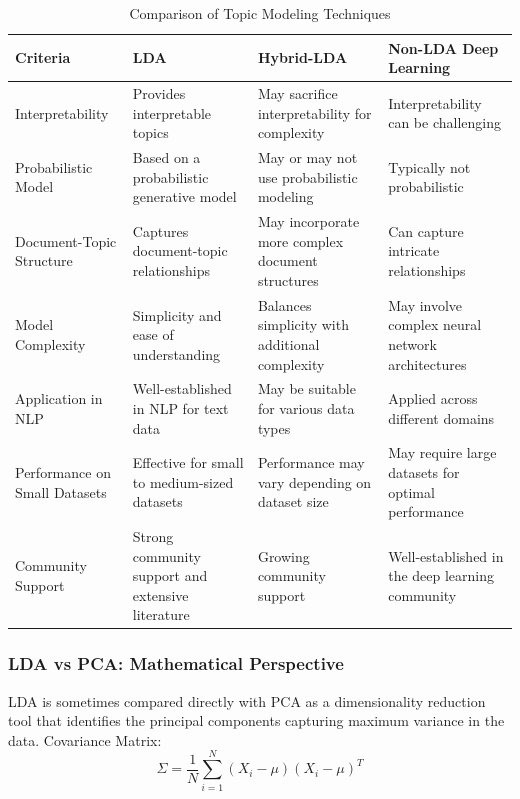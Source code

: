 \documentclass[sn-mathphys,Numbered]{sn-jnl}%
\theoremstyle{thmstyleone}%
\theoremstyle{thmstyletwo}%
\theoremstyle{thmstylethree}%
\begin{document}
\begin{table}[h]
    \centering
    \begin{tabularx}{\textwidth}{X X X X}
        \toprule
        \textbf{Criteria} & \textbf{LDA} & \textbf{Hybrid-LDA} & \textbf{Non-LDA Deep Learning} \\
        \midrule
        Interpretability & Provides interpretable topics & May sacrifice interpretability for complexity & Interpretability can be challenging \\
        Probabilistic Model & Based on a probabilistic generative model & May or may not use probabilistic modeling & Typically not probabilistic \\
        Document-Topic Structure & Captures document-topic relationships & May incorporate more complex document structures & Can capture intricate relationships \\
        Model Complexity & Simplicity and ease of understanding & Balances simplicity with additional complexity & May involve complex neural network architectures \\
        Application in NLP & Well-established in NLP for text data & May be suitable for various data types & Applied across different domains \\
        Performance on Small Datasets & Effective for small to medium-sized datasets & Performance may vary depending on dataset size & May require large datasets for optimal performance \\
        Community Support & Strong community support and extensive literature & Growing community support & Well-established in the deep learning community \\
        \bottomrule
    \end{tabularx}
    \caption{Comparison of Topic Modeling Techniques}
    \label{table:topic_modeling_comparison}
\end{table}

\subsubsection{LDA vs PCA: Mathematical Perspective}
LDA is sometimes compared directly with PCA as a dimensionality reduction tool that identifies the principal components capturing maximum variance in the data. Covariance Matrix:
\begin{equation}
    \Sigma = \frac{1}{N}\sum_{i=1}^{N}(X_i - \mu)(X_i - \mu)^T
\end{equation}
\end{document}
